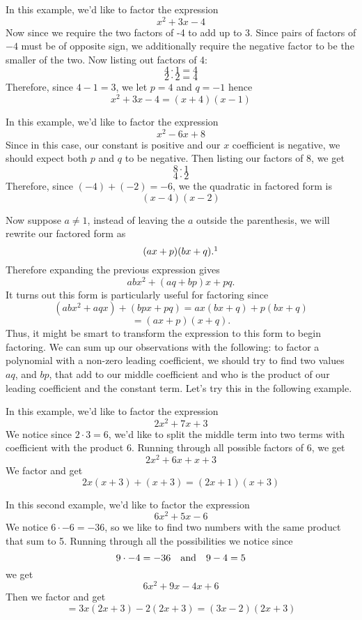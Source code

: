 \begin{ex}
In this example, we'd like to factor the expression
$$x^2+3x-4$$
Now since we require the two factors of -4 to add up to 3.
Since pairs of factors of $-4$ must be of opposite sign,
we additionally require the negative factor to be the smaller of the two.
Now listing out factors of 4:
$$4\cdot 1 =4$$
$$2\cdot 2=4$$
Therefore, since $4-1=3$, we let $p=4$ and $q=-1$ hence
$$x^2+3x-4=(x+4)(x-1)$$
\end{ex}
\begin{ex}
In this example, we'd like to factor the expression
$$x^2-6x+8$$
Since in this case, our constant is positive and our $x$ coefficient is negative, we should expect both $p$ and $q$ to be negative. Then listing our factors of $8$, we get
$$8\cdot 1$$
$$4\cdot 2$$
Therefore, since $(-4)+(-2)=-6$, we the quadratic in factored form is
$$(x-4)(x-2)$$
\end{ex}
Now suppose $a\neq1$, instead of leaving the $a$ outside the parenthesis, we will rewrite our factored form as
$$(ax+p)(bx+q).\footnotemark$$
Therefore expanding the previous expression gives
$$abx^2+(aq+bp)x+pq.$$
It turns out this form is particularly useful for factoring since
$$(abx^2+aqx)+(bpx+pq)=ax(bx+q)+p(bx+q)$$
$$=(ax+p)(x+q).$$
Thus, it might be smart to transform the expression to this form to begin factoring.
We can sum up our observations with the following:
to factor a polynomial with a non-zero leading coefficient, we should try to find two values $aq$, and $bp$, that add to our middle coefficient and who is the product of our leading coefficient and the constant term.
Let's try this in the following example.
\begin{ex}
	\label{ex:1st_sm}
	In this example, we'd like to factor the expression
	$$2x^2+7x+3$$
	We notice since $2\cdot 3=6$, we'd like to split the middle term into two terms with coefficient with the product $6$. Running through all possible factors of $6$, we get
	$$2x^2+6x+x+3$$
	We factor and get
	$$2x(x+3)+(x+3)=(2x+1)(x+3)$$
\end{ex}

\begin{ex}
	In this second example, we'd like to factor the expression
	$$6x^2+5x-6$$
	We notice $6\cdot -6=-36$, so we like to find two numbers with the same product that sum to 5. Running through all the possibilities we notice since $$9\cdot -4=-36\quad\text{and}\quad 9-4=5$$
	we get
	$$6x^2+9x-4x+6$$
	Then we factor and get
	$$=3x(2x+3)-2(2x+3)=(3x-2)(2x+3)$$
\end{ex}

